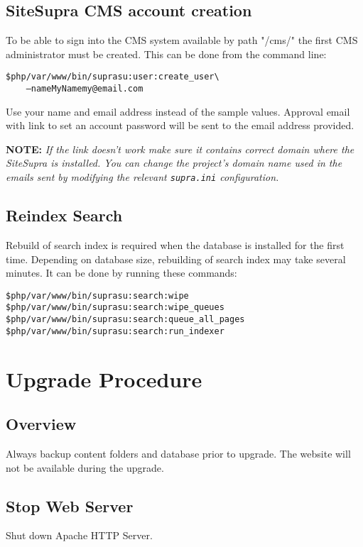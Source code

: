 \documentclass[12pt]{article}
\newcommand{\vigShowNotes}{1}
\newcommand{\vigPathToProject}{/var/www}
\newcommand{\note}[1]{
\textbf{NOTE:} 
\textit{#1}
}
\begin{document}
\subsection{SiteSupra CMS account creation}

To be able to sign into the CMS system available by path "/cms/" the first CMS administrator must be created. This can be done from the command line:

\begin{alltt}
\$ php /var/www/bin/supra su:user:create_user \textbackslash
\ \ \ \ --name MyName my@email.com
\end{alltt}

Use your name and email address instead of the sample values. 
Approval email with link to set an account password will be sent to the email address provided.

\note{If the link doesn't work make sure it contains correct domain where the SiteSupra is installed. You can change the project's domain name used in the emails sent by modifying the relevant \texttt{supra.ini} configuration.}

\subsection{Reindex Search\label{reindexSearch}}
Rebuild of search index is required when the database is installed for the first time. Depending on database size, rebuilding of search index may take several minutes. It can be done by running these commands:

\begin{alltt}
\$ php \vigPathToProject/bin/supra su:search:wipe
\$ php \vigPathToProject/bin/supra su:search:wipe_queues
\$ php \vigPathToProject/bin/supra su:search:queue_all_pages
\$ php \vigPathToProject/bin/supra su:search:run_indexer
\end{alltt}

\section{Upgrade Procedure}

\subsection{Overview}
Always backup content folders and database prior to upgrade. The website will not be available during the upgrade.

\subsection{Stop Web Server}
Shut down Apache HTTP Server.
\end{document}
